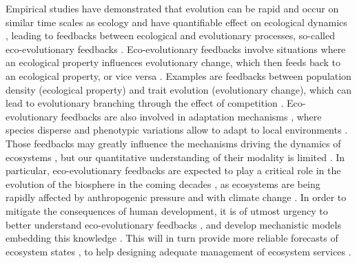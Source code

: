 % 
Empirical studies have demonstrated that evolution can be rapid and occur on similar time scales as ecology \cite{Hairston2005, Pelletier2009} and have quantifiable effect on ecological dynamics \cite{Ezard2009}, leading to feedbacks between ecological and evolutionary processes, so-called eco-evolutionary feedbacks \cite{Pelletier2009,Schoener2011}. 
% 
Eco-evolutionary feedbacks involve situations where an ecological property influences evolutionary change, which then feeds back to an ecological property, or vice versa \cite{Govaert2019a}. Examples are feedbacks between population density (ecological property) and trait evolution (evolutionary change), which can lead to evolutionary branching through the effect of competition \cite{Doebeli1999}.
% 
Eco-evolutionary feedbacks are also involved in adaptation mechanisms \cite{Doebeli1999}, where species disperse and phenotypic variations allow to adapt to local environments \cite{XXX}.
% 
Those feedbacks may greatly influence the mechanisms driving the dynamics of ecosystems \cite{Urban2016}, but our quantitative understanding of their modality is limited \cite{Lion2022}.
% 
In particular, eco-evolutionary feedbacks are expected to play a critical role in the evolution of the biosphere in the coming decades \cite{Norberg2012}, as ecosystems are being rapidly affected by anthropogenic pressure and with climate change \cite{Ellis2011,Midgley2019}.
% 
In order to mitigate the consequences of human development, it is of utmost urgency to better understand eco-evolutionary feedbacks \cite{Norberg2012}, and develop mechanistic models embedding this knowledge \cite{Urban2016}. This will in turn provide more reliable forecasts of ecosystem states \cite{Clark2001}, to help designing adequate management of ecosystem services \cite{Urban2016}.
% 
% 



